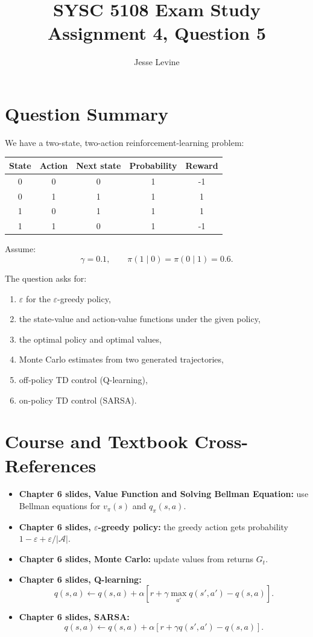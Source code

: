 \documentclass[11pt]{article}
\title{SYSC 5108 Exam Study\\Assignment 4, Question 5}
\author{Jesse Levine}
\date{}
\begin{document}
\maketitle

\section*{Question Summary}

We have a two-state, two-action reinforcement-learning problem:

\begin{center}
\begin{tabular}{ccccc}
\toprule
State & Action & Next state & Probability & Reward \\
\midrule
0 & 0 & 0 & 1 & -1 \\
0 & 1 & 1 & 1 & 1 \\
1 & 0 & 1 & 1 & 1 \\
1 & 1 & 0 & 1 & -1 \\
\bottomrule
\end{tabular}
\end{center}

Assume:
\[
    \gamma=0.1,
    \qquad
    \pi(1\mid 0)=\pi(0\mid 1)=0.6.
\]

The question asks for:
\begin{enumerate}[label=(\alph*)]
    \item \(\varepsilon\) for the \(\varepsilon\)-greedy policy,
    \item the state-value and action-value functions under the given policy,
    \item the optimal policy and optimal values,
    \item Monte Carlo estimates from two generated trajectories,
    \item off-policy TD control (Q-learning),
    \item on-policy TD control (SARSA).
\end{enumerate}

\section*{Course and Textbook Cross-References}

\begin{itemize}
    \item \textbf{Chapter 6 slides, Value Function and Solving Bellman Equation:}
    use Bellman equations for \(v_\pi(s)\) and \(q_\pi(s,a)\).
    \item \textbf{Chapter 6 slides, \(\varepsilon\)-greedy policy:} the greedy
    action gets probability \(1-\varepsilon+\varepsilon/|\mathcal{A}|\).
    \item \textbf{Chapter 6 slides, Monte Carlo:} update values from returns
    \(G_t\).
    \item \textbf{Chapter 6 slides, Q-learning:}
    \[
        q(s,a)\leftarrow q(s,a)+\alpha\left[r+\gamma\max_{a'}q(s',a')-q(s,a)\right].
    \]
    \item \textbf{Chapter 6 slides, SARSA:}
    \[
        q(s,a)\leftarrow q(s,a)+\alpha\left[r+\gamma q(s',a')-q(s,a)\right].
    \]
\end{itemize}
\end{document}
